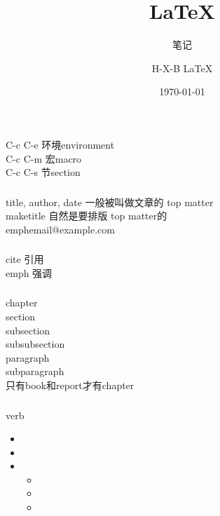 \documentclass{beamer}
\begin{document}
\begin{CJK}{UTF8}{gkai}

  \title{\LaTeX{}}
  \subtitle{笔记}
  \author{H-X-B \LaTeX{} }
  \date{\today}

  \frame{\titlepage}

  \begin{frame}\frametitle{}
    C-c C-e 环境environment\\
    C-c C-m 宏macro\\
    C-c C-s 节section
  \end{frame}

  \begin{frame}\frametitle{}
    title, author, date 一般被叫做文章的 top matter \\
    maketitle 自然是要排版 top matter的\\
    emph{email@example.com}\\
  \end{frame}

  \begin{frame}\frametitle{}
    cite 引用\\
    emph 强调\\
  \end{frame}

  \begin{frame}\frametitle{}
    chapter\\
    section\\
    subsection\\
    subsubsection\\
    paragraph\\
    subparagraph\\
    只有book和report才有chapter\\
  \end{frame}

  \begin{frame}\frametitle{}
    verb
    \begin{itemize}
      \item %
      \item
      \item
        \begin{itemize}
          \item
          \item
          \item
        \end{itemize}
    \end{itemize}
  \end{frame}

\end{CJK}
\end{document}
